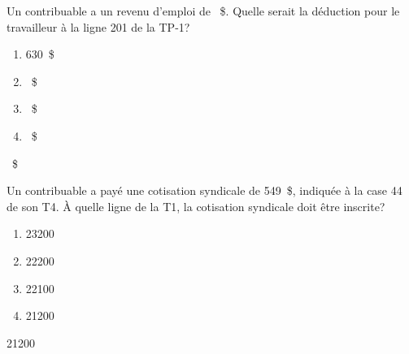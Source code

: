 \begin{question}
	Un contribuable a un revenu d'emploi de ~\$. Quelle serait la déduction pour le travailleur à la ligne 201 de la TP-1?
	\begin{enumerate}[label=\Alph*.]
		\item 630~\$
		\item {}~\$
		\item {}~\$
		\item {}~\$
	\end{enumerate}
\end{question}
~\$

\begin{question}
	Un contribuable a payé une cotisation syndicale de 549~\$, indiquée à la case 44 de son T4. À quelle ligne de la T1, la cotisation syndicale doit être inscrite?
	\begin{enumerate}[label=\Alph*.]
		\item 23200
		\item 22200
		\item 22100
		\item 21200
	\end{enumerate}
\end{question}
21200
